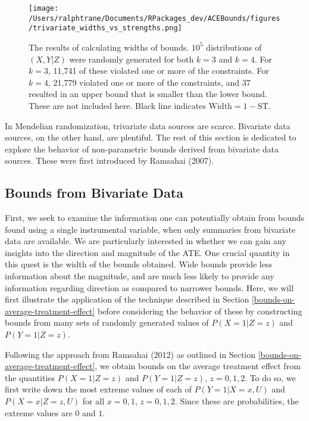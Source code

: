 \documentclass[
]{article}
\theoremstyle{plain}
\begin{document}
\begin{figure}[H]
  \center
  \texttt{[image: /Users/ralphtrane/Documents/RPackages\_dev/ACEBounds/figures/trivariate\_widths\_vs\_strengths.png]}
  \caption{The results of calculating widths of bounds. \ensuremath{10^{5}} distributions of $(X,Y|Z)$ were randomly generated for both $k = 3$ and $k = 4$. For $k = 3$, 11,741 of these violated one or more of the constraints. For $k = 4$, 21,779 violated one or more of the constraints, and 37 resulted in an upper bound that is smaller than the lower bound. These are not included here. Black line indicates $\text{Width} = 1-\text{ST}$.}
  \label{fig:trivariate-bound-on-width}
\end{figure}

In Mendelian randomization, trivariate data sources are scarce. Bivariate data sources, on the other hand, are plentiful. The rest of this section is dedicated to explore the behavior of non-parametric bounds derived from bivariate data sources. These were first introduced by Ramsahai (2007).

\hypertarget{bounds-from-bivariate-data}{%
\subsection{Bounds from Bivariate Data}\label{bounds-from-bivariate-data}}

First, we seek to examine the information one can potentially obtain from bounds found using a single instrumental variable, when only summaries from bivariate data are available. We are particularly interested in whether we can gain any insights into the direction and magnitude of the ATE. One crucial quantity in this quest is the width of the bounds obtained. Wide bounds provide less information about the magnitude, and are much less likely to provide any information regarding direction as compared to narrower bounds. Here, we will first illustrate the application of the technique described in Section \ref{bounds-on-average-treatment-effect} before considering the behavior of these by constructing bounds from many sets of randomly generated values of \(P(X = 1 | Z = z)\) and \(P(Y = 1 | Z = z)\).

Following the approach from Ramsahai (2012) as outlined in Section \ref{bounds-on-average-treatment-effect}, we obtain bounds on the average treatment effect from the quantities \(P(X = 1 | Z = z)\) and \(P(Y = 1 | Z = z)\), \(z = 0,1,2\). To do so, we first write down the most extreme values of each of \(P(Y = 1 | X = x, U)\) and \(P(X = x | Z = z, U)\) for all \(x=0,1\), \(z=0,1,2\). Since these are probabilities, the extreme values are \(0\) and \(1\).
\end{document}
